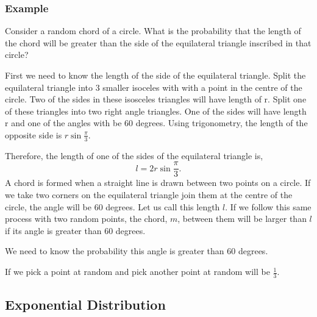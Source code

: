 \documentclass{article}
\begin{document}
\subsubsection{Example}

Consider a random chord of a circle. What is the probability that the length of the chord will be greater than the side of the equilateral triangle inscribed in that circle?

First we need to know the length of the side of the equilateral triangle. Split the equilateral triangle into 3 smaller isoceles with with a point in the centre of the circle. Two of the sides in these isosceles triangles will have length of r. Split one of these triangles into two right angle triangles. One of the sides will have length r and one of the angles with be 60 degrees. Using trigonometry, the length of the opposite side is $r \sin \frac{\pi}{3}$.

Therefore, the length of one of the sides of the equilateral triangle is,
$$
    l = 2 r \sin \frac{\pi}{3}.
$$
A chord is formed when a straight line is drawn between two points on a circle. If we take two corners on the equilateral triangle join them at the centre of the circle, the angle will be 60 degrees. Let us call this length $l$. If we follow this same process with two random points, the chord, $m$, between them will be larger than $l$ if its angle is greater than $60$ degrees.

We need to know the probability this angle is greater than $60$ degrees.

If we pick a point at random and pick another point at random will be $\frac{1}{3}$.

\subsection{Exponential Distribution}
\end{document}
